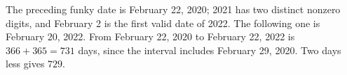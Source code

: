 The preceding funky date is February 22, 2020; 2021 has two distinct nonzero digits, and February 2 is the first valid date of 2022. The following one is February 20, 2022. From February 22, 2020 to February 22, 2022 is $366+365=731$ days, since the interval includes February 29, 2020. Two days less gives $\boxed{729}$.
